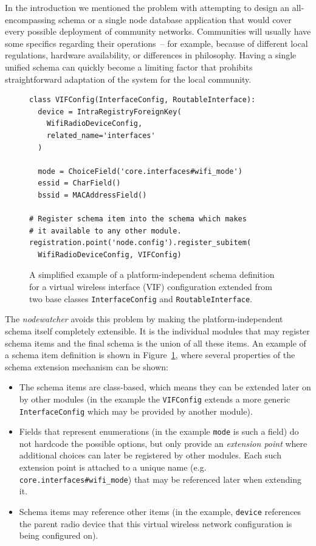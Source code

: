 \documentclass[5p,sort&compress]{elsarticle}
\newcommand{\nodewatcher}{\textit{nodewatcher}}
\begin{document}
In the introduction we mentioned the problem with attempting to design an all-encompassing schema or a single node database application that would cover every possible deployment of community networks.
Communities will usually have some specifics regarding their operations~-- for example, because of different local regulations, hardware availability, or differences in philosophy.
Having a single unified schema can quickly become a limiting factor that prohibits straightforward adaptation of the system for the local community.

\begin{figure}
\centering
\begin{verbatim}
class VIFConfig(InterfaceConfig, RoutableInterface):
  device = IntraRegistryForeignKey(
    WifiRadioDeviceConfig,
    related_name='interfaces'
  )

  mode = ChoiceField('core.interfaces#wifi_mode')
  essid = CharField()
  bssid = MACAddressField()

# Register schema item into the schema which makes
# it available to any other module.
registration.point('node.config').register_subitem(
  WifiRadioDeviceConfig, VIFConfig)
\end{verbatim}
\caption{A simplified example of a platform-independent schema definition for a virtual wireless interface (VIF) configuration extended from two base classes \texttt{InterfaceConfig} and \texttt{RoutableInterface}.}
\label{fig:schema-module-wifi}
\end{figure}

The \nodewatcher{} avoids this problem by making the platform-independent schema itself completely extensible.
It is the individual modules that may register schema items and the final schema is the union of all these items.
An example of a schema item definition is shown in Figure~\ref{fig:schema-module-wifi}, where several properties of the schema extension mechanism can be shown:
\begin{itemize}
    \item The schema items are class-based, which means they can be extended later on by other modules (in the example the \texttt{VIFConfig} extends a more generic \texttt{InterfaceConfig} which may be provided by another module).
    \item Fields that represent enumerations (in the example \texttt{mode} is such a field) do not hardcode the possible options, but only provide an \textit{extension point} where additional choices can later be registered by other modules.
    Each such extension point is attached to a unique name (e.g. \texttt{core.interfaces\#wifi\_mode}) that may be referenced later when extending it.
    \item Schema items may reference other items (in the example, \texttt{device} references the parent radio device that this virtual wireless network configuration is being configured on).
\end{itemize}
\end{document}
